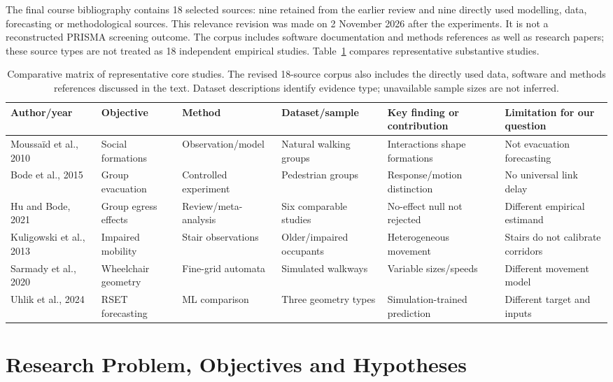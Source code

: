 \documentclass[conference]{IEEEtran}
\begin{document}
The final course bibliography contains 18 selected sources: nine retained from the earlier review and nine directly used modelling, data, forecasting or methodological sources. This relevance revision was made on 2 November 2026 after the experiments. It is not a reconstructed PRISMA screening outcome. The corpus includes software documentation and methods references as well as research papers; these source types are not treated as 18 independent empirical studies. Table~\ref{tab:literature} compares representative substantive studies.

\begin{table}[!t]\centering\footnotesize
\caption{Comparative matrix of representative core studies. The revised 18-source corpus also includes the directly used data, software and methods references discussed in the text. Dataset descriptions identify evidence type; unavailable sample sizes are not inferred.}
\label{tab:literature}
\begin{tabularx}{\textwidth}{p{2.2cm}XXXXX}\toprule
Author/year & Objective & Method & Dataset/sample & Key finding or contribution & Limitation for our question\\\midrule
Moussa\"id et al., 2010 \cite{r1} & Social formations & Observation/model & Natural walking groups & Interactions shape formations & Not evacuation forecasting\\
Bode et al., 2015 \cite{r2} & Group evacuation & Controlled experiment & Pedestrian groups & Response/motion distinction & No universal link delay\\
Hu and Bode, 2021 \cite{L17} & Group egress effects & Review/meta-analysis & Six comparable studies & No-effect null not rejected & Different empirical estimand\\
Kuligowski et al., 2013 \cite{L08} & Impaired mobility & Stair observations & Older/impaired occupants & Heterogeneous movement & Stairs do not calibrate corridors\\
Sarmady et al., 2020 \cite{r3} & Wheelchair geometry & Fine-grid automata & Simulated walkways & Variable sizes/speeds & Different movement model\\
Uhlik et al., 2024 \cite{r5} & RSET forecasting & ML comparison & Three geometry types & Simulation-trained prediction & Different target and inputs\\\bottomrule
\end{tabularx}
\end{table}

\section{Research Problem, Objectives and Hypotheses}
\end{document}
